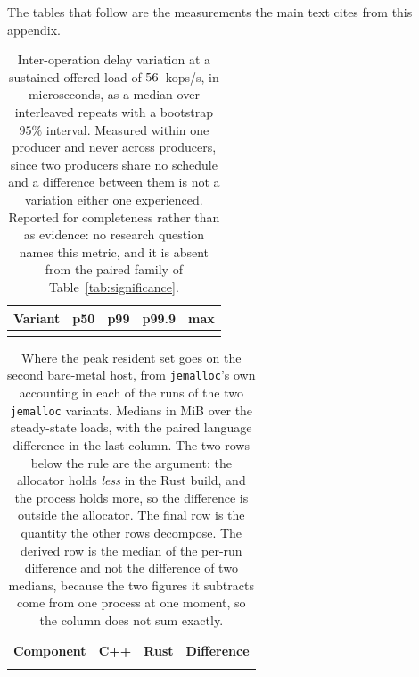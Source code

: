 \documentclass[english,oneside,a4paper,censored,csm,software-track-2020]{HYthesisML}
\begin{document}
\begin{appendices}
The tables that follow are the measurements the main text cites from this appendix.

\begin{table}[ht]
\centering
\small
\caption[Inter-operation jitter at the representative load]{Inter-operation delay variation at a
sustained offered load of $56$~kops/s, in microseconds, as a median over \NRepeats{}
interleaved repeats with a bootstrap $95\%$ interval. Measured within one producer and never across
producers, since two producers share no schedule and a difference between them is not a variation
either one experienced. Reported for completeness rather than as evidence: no research question
names this metric, and it is absent from the paired family of
Table~\ref{tab:significance}.\label{tab:jitter}}
\begin{tabular}{@{}l r r r r@{}}
\hline\hline
Variant & p50 & p99 & p99.9 & max \\
\hline
\\
\hline
\end{tabular}
\end{table}

\begin{table}[ht]
\centering
\small
\caption[The resident set decomposed by the allocator]{Where the peak resident set goes on the
second bare-metal host, from \texttt{jemalloc}'s own accounting in each of the \BmJeRuns{} runs of
the two \texttt{jemalloc} variants. Medians in MiB over the steady-state loads, with the paired language
difference in the last column. The two rows below the rule are the argument: the allocator holds
\emph{less} in the Rust build, and the process holds more, so the difference is outside the
allocator. The final row is the quantity the other rows decompose. The derived row is the median of
the per-run difference and not the difference of two medians, because the two figures it subtracts
come from one process at one moment, so the column does not sum
exactly.\label{tab:resident}}
\begin{tabular}{@{}l r r r@{}}
\hline\hline
Component & C++ & Rust & Difference \\
\hline
\\
\hline
\end{tabular}
\end{table}


\end{appendices}
\end{document}
